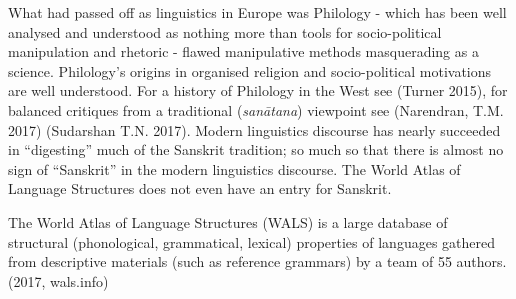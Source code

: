 What had passed off as linguistics in Europe was Philology - which has been well analysed and understood as nothing more than tools for socio-political manipulation and rhetoric - flawed manipulative methods masquerading as a science. Philology’s origins in organised religion and socio-political motivations are well understood. For a history of Philology in the West see (Turner 2015), for balanced critiques from a traditional (\textit{sanātana}) viewpoint see (Narendran, T.M. 2017) (Sudarshan T.N. 2017). Modern linguistics discourse has nearly succeeded in “digesting” much of the Sanskrit tradition; so much so that there is almost no sign of “Sanskrit” in the modern linguistics discourse. The World Atlas of Language Structures does not even have an entry for Sanskrit.

\begin{myquote}
The World Atlas of Language Structures (WALS) is a large database of structural (phonological, grammatical, lexical) properties of languages gathered from descriptive materials (such as reference grammars) by a team of 55 authors. (2017, wals.info)
\end{myquote}

